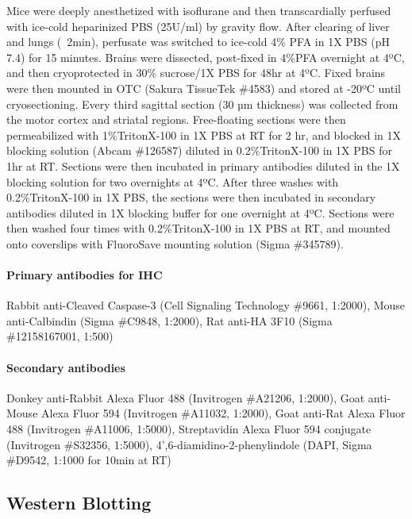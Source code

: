 Mice were deeply anesthetized with isoflurane and then transcardially perfused
with ice-cold heparinized PBS (25U/ml) by gravity flow. After clearing of liver
and lungs (~2min), perfusate was switched to ice-cold 4\% PFA in 1X PBS (pH 7.4)
for 15 minutes. Brains were dissected, post-fixed in 4\%PFA overnight at 4ºC,
and then cryoprotected in 30\% sucrose/1X PBS for 48hr at 4ºC. Fixed brains were
then mounted in OTC (Sakura TissueTek \#4583) and stored at -20ºC until
cryosectioning. Every third sagittal section (30 µm thickness) was collected
from the motor cortex and striatal regions. Free-floating sections were then
permeabilized with 1\%TritonX-100 in 1X PBS at RT for 2 hr, and blocked in 1X
blocking solution (Abcam \#126587) diluted in 0.2\%TritonX-100 in 1X PBS for 1hr
at RT. Sections were then incubated in primary antibodies diluted in the 1X
blocking solution for two overnights at 4ºC. After three washes with
0.2\%TritonX-100 in 1X PBS, the sections were then incubated in secondary
antibodies diluted in 1X blocking buffer for one overnight at 4ºC. Sections were
then washed four times with 0.2\%TritonX-100 in 1X PBS at RT, and mounted onto
coverslips with FluoroSave mounting solution (Sigma \#345789). 

\paragraph{Primary antibodies for IHC} Rabbit anti-Cleaved Caspase-3 (Cell
Signaling Technology \#9661, 1:2000), Mouse anti-Calbindin (Sigma \#C9848,
1:2000), Rat anti-HA 3F10 (Sigma \#12158167001, 1:500)

\paragraph{Secondary antibodies} Donkey anti-Rabbit Alexa Fluor 488
(Invitrogen \#A21206, 1:2000), Goat anti-Mouse Alexa Fluor 594 (Invitrogen
\#A11032, 1:2000), Goat anti-Rat Alexa Fluor 488 (Invitrogen \#A11006, 1:5000),
Streptavidin Alexa Fluor 594 conjugate (Invitrogen \#S32356, 1:5000),
4',6-diamidino-2-phenylindole (DAPI, Sigma \#D9542, 1:1000 for 10min at RT)

\subsection{Western Blotting}

